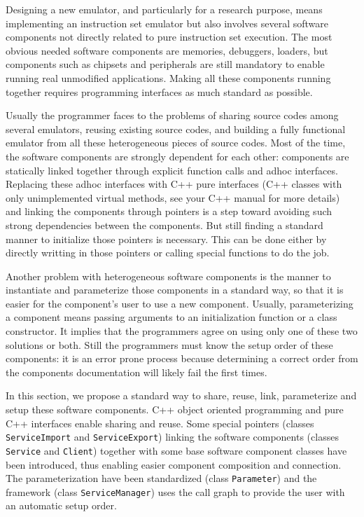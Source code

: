 Designing a new emulator, and particularly for a research purpose, means implementing an instruction set emulator but also involves several software components not directly related to pure instruction set execution.
The most obvious needed software components are memories, debuggers, loaders, but components such as chipsets and peripherals are still mandatory to enable running real unmodified applications.
Making all these components running together requires programming interfaces as much standard as possible.

Usually the programmer faces to the problems of sharing source codes among several emulators, reusing existing source codes, and building a fully functional emulator from all these heterogeneous pieces of source codes.
Most of the time, the software components are strongly dependent for each other: components are statically linked together through explicit function calls and adhoc interfaces.
Replacing these adhoc interfaces with C++ pure interfaces (C++ classes with only unimplemented virtual methods, see your C++ manual for more details) and linking the components through pointers is a step toward avoiding such strong dependencies between the components. But still finding a standard manner to initialize those pointers is necessary. This can be done either by directly writting in those pointers or calling special functions to do the job.

Another problem with heterogeneous software components is the manner to instantiate and parameterize those components in a standard way, so that it is easier for the component's user to use a new component.
Usually, parameterizing a component means passing arguments to an initialization function or a class constructor. It implies that the programmers agree on using only one of these two solutions or both.
Still the programmers must know the setup order of these components: it is an error prone process because determining a correct order from the components documentation will likely fail the first times.


In this section, we propose a standard way to share, reuse, link, parameterize and setup these software components.
C++ object oriented programming and pure C++ interfaces enable sharing and reuse.
Some special pointers (classes \texttt{ServiceImport} and \texttt{ServiceExport}) linking the software components (classes \texttt{Service} and \texttt{Client}) together with some base software component classes have been introduced, thus enabling easier component composition and connection.
The parameterization have been standardized (class \texttt{Parameter}) and the framework (class \texttt{ServiceManager}) uses the call graph to provide the user with an automatic setup order.

